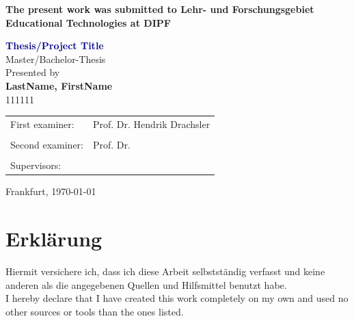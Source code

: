 \documentclass[twoside,11pt,titlepage,a4paper,english,bibliography=totocnumbered,listof=numbered]{scrbook}
\begin{document}
\begin{titlepage}
	\strut
	\hfill
	\vspace{0.5cm}
	\begin{flushleft}
		\begin{spacing}{.9}
			\large
			\textbf{The present work was submitted to Lehr- und Forschungsgebiet Educational Technologies at DIPF}
		\end{spacing}
		\vspace{2cm}
		\Huge
		\textcolor{DarkBlue}{\textbf{Thesis/Project Title}}\\
		\large
		\vspace{2cm} 
	 	Master/Bachelor-Thesis\\
	 	\vspace{2cm} 
	 	Presented by\\
	 	\vspace{0.3cm} 
	 	\textbf{LastName, FirstName}\\
	 	\vspace{0.3cm} 
	 	111111\\
	 	\vspace{2.5cm}
	 	\begin{tabular}{ll}
	 		First examiner: & Prof. Dr. Hendrik Drachsler\\
	 		\\
	 		Second examiner: & Prof. Dr. \\
	 		\\
	 		Supervisors: &  \\
	 	\end{tabular}
	 	
	\end{flushleft}
	\begin{flushright}
		\vspace{2.5cm} 
	 	Frankfurt, \today\\
	\end{flushright}

\end{titlepage}
\thispagestyle{empty}

\cleardoublepage

\newpage
\section*{\thispagestyle{empty}Erklärung}
Hiermit versichere ich, dass ich diese Arbeit selbst\-ständig verfasst und keine anderen als die angegebenen Quellen und Hilfsmittel benutzt habe. \\

\noindent I hereby declare that I have created this work completely on my own and used no other sources or tools than the ones listed.
\end{document}

